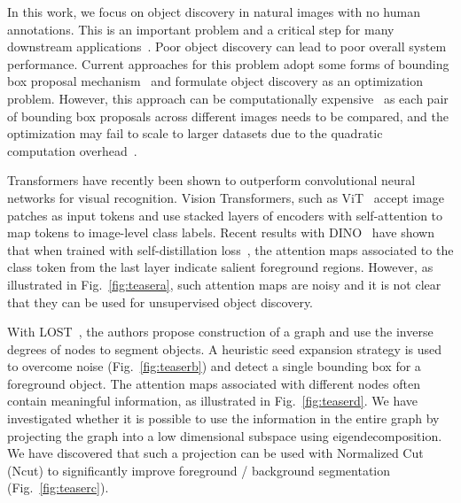 \documentclass[twocolumn]{article}
\begin{document}
In this work, we focus on object discovery in natural images with no human annotations. This is an important problem and a critical step for many downstream applications~\cite{vo2020toward}. 
Poor object discovery can lead to poor overall system performance. Current approaches for this problem adopt some forms of bounding box proposal mechanism~\cite{cho2015unsupervised, wei2019unsupervised,vo2020toward,vo2019unsupervised} and formulate object discovery as an optimization problem. However, this approach can be computationally expensive~\cite{vo2019unsupervised} as each pair of bounding box proposals across different images needs to be compared, and the optimization may fail to scale to larger datasets due to the quadratic computation overhead~\cite{vo2021large}. 

Transformers have recently been shown to outperform convolutional neural networks for visual recognition. Vision Transformers, such as ViT~\cite{dosovitskiy2020image} accept image patches as input tokens and use stacked layers of encoders with self-attention to map tokens to image-level class labels. Recent results with DINO~\cite{caron2021emerging} have shown that when trained with self-distillation loss~\cite{hinton2015distilling}, the attention maps associated to the class token from the last layer indicate salient foreground regions. 
However, as illustrated in Fig.~\ref{fig:teasera}, such attention maps are noisy and it is not clear that they can be used for unsupervised object discovery. 

With LOST~\cite{simeoni2021localizing}, the authors propose construction of a graph and use the inverse degrees of nodes to segment objects.  A heuristic seed expansion strategy is used to overcome  noise (Fig.~\ref{fig:teaserb}) and detect a single bounding box for a foreground object. The attention maps associated with different nodes often contain meaningful information, as illustrated in Fig.~\ref{fig:teaserd}.
We have investigated whether it is possible to use the information in the entire graph by projecting the graph into a low dimensional subspace using eigendecomposition. We have discovered that such a projection can be used with Normalized Cut~\cite{shi2000normalized} (Ncut) to significantly improve  foreground / background segmentation (Fig.~\ref{fig:teaserc}). 
\end{document}
